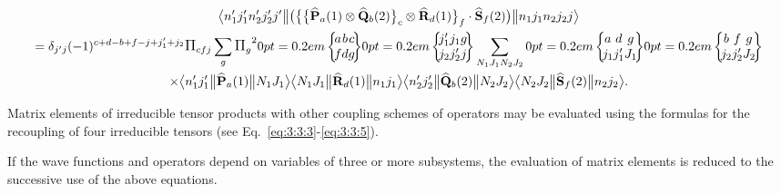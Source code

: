 \begin{multline*}
\braOketred{ n_{1}^{\prime} j_{1}^{\prime} n_{2}^{\prime} j_{2}^{\prime} j^{\prime}}{\bigl(\bigl\{\bigl\{\widehat{\vect{P}}_{a}(1) \otimes \widehat{\vect{Q}}_{b}(2)\bigr\}_{c} \otimes \widehat{\vect{R}}_{d}(1)\bigr\}_{f} \cdot \widehat{\vect{S}}_{f}(2)\bigr)}{n_{1} j_{1} n_{2} j_{2} j}\\
=\delta_{j^{\prime} j}(-1)^{c+d-b+f-j+j_{1}^{\prime}+j_{2}} \Fact{c f j} \sum_{g} \Fact{g}^{2}
\sixj{a}{b}{c}{f}{d}{g}
\sixj{j_{1}^{\prime}}{j_{1}}{g}{j_{2}}{j_{2}^{\prime}}{j} 
 \sum_{N_{1} J_{1} N_{2} J_{2}}
\sixj{a}{d}{g}{j_{1}}{j_{1}^{\prime}}{J_{1}}
\sixj{b}{f}{g}{j_{2}}{j_{2}^{\prime}}{J_{2}}
\\ \times
\braOketred{ n_{1}^{\prime} j_{1}^{\prime}}{\widehat{\vect{P}}_{a}(1)}{ N_{1} J_{1}}
\braOketred{ N_{1} J_{1}}{\widehat{\vect{R}}_{d}(1)}{ n_{1} j_{1}}
\braOketred{ n_{2}^{\prime} j_{2}^{\prime}}{\widehat{\vect{Q}}_{b}(2)}{ N_{2} J_{2}}
\braOketred{ N_{2} J_{2}}{\widehat{\vect{S}}_{f}(2)}{ n_{2} j_{2}} .
\end{multline*}

Matrix elements of irreducible tensor products with other coupling schemes of operators may be evaluated using the formulas for the recoupling of four irreducible tensors (see Eq.~\eqref{eq:3:3:3}-\eqref{eq:3:3:5}).

If the wave functions and operators depend on variables of three or more subsystems, the evaluation of matrix elements is reduced to the successive use of the above equations.

